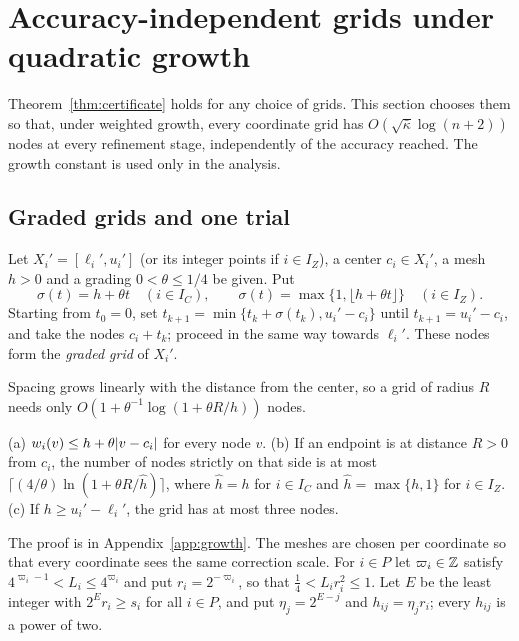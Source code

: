 \section{Accuracy-independent grids under quadratic growth}\label{sec:growth}

Theorem~\ref{thm:certificate} holds for any choice of grids. This section
chooses them so that, under weighted growth, every coordinate grid has
$O(\sqrt{\bar\kappa}\log(n+2))$ nodes at every refinement stage, independently
of the accuracy reached. The growth constant is used only in the analysis.

\subsection{Graded grids and one trial}

\begin{definition}\label{def:graded}
Let $X_i'=[\ell_i',u_i']$ (or its integer points if $i\in I_Z$), a center
$c_i\in X_i'$, a mesh $h>0$ and a grading $0<\theta\le1/4$ be given. Put
\begin{equation}\label{eq:step}
\sigma(t)=h+\theta t\quad(i\in I_C),\qquad
\sigma(t)=\max\{1,\lfloor h+\theta t\rfloor\}\quad(i\in I_Z).
\end{equation}
Starting from $t_0=0$, set $t_{k+1}=\min\{t_k+\sigma(t_k),u_i'-c_i\}$ until
$t_{k+1}=u_i'-c_i$, and take the nodes $c_i+t_k$; proceed in the same way
towards $\ell_i'$. These nodes form the \emph{graded grid} of $X_i'$.
\end{definition}

Spacing grows linearly with the distance from the center, so a grid of radius
$R$ needs only $O(1+\theta^{-1}\log(1+\theta R/h))$ nodes.

\begin{lemma}\label{lem:graded}
(a) $w_i(v)\le h+\theta\lvert v-c_i\rvert$ for every node $v$.
(b) If an endpoint is at distance $R>0$ from $c_i$, the number of nodes
strictly on that side is at most $\lceil(4/\theta)\ln(1+\theta R/\hat h)\rceil$,
where $\hat h=h$ for $i\in I_C$ and $\hat h=\max\{h,1\}$ for $i\in I_Z$.
(c) If $h\ge u_i'-\ell_i'$, the grid has at most three nodes.
\end{lemma}

The proof is in Appendix~\ref{app:growth}. The meshes are chosen per
coordinate so that every coordinate sees the same correction scale. For
$i\in P$ let $\varpi_i\in\mathbb Z$ satisfy $4^{\varpi_i-1}<L_i\le4^{\varpi_i}$ and
put $r_i=2^{-\varpi_i}$, so that $\frac14<L_ir_i^2\le1$. Let $E$ be the least
integer with $2^Er_i\ge s_i$ for all $i\in P$, and put $\eta_j=2^{E-j}$ and
$h_{ij}=\eta_jr_i$; every $h_{ij}$ is a power of two.

